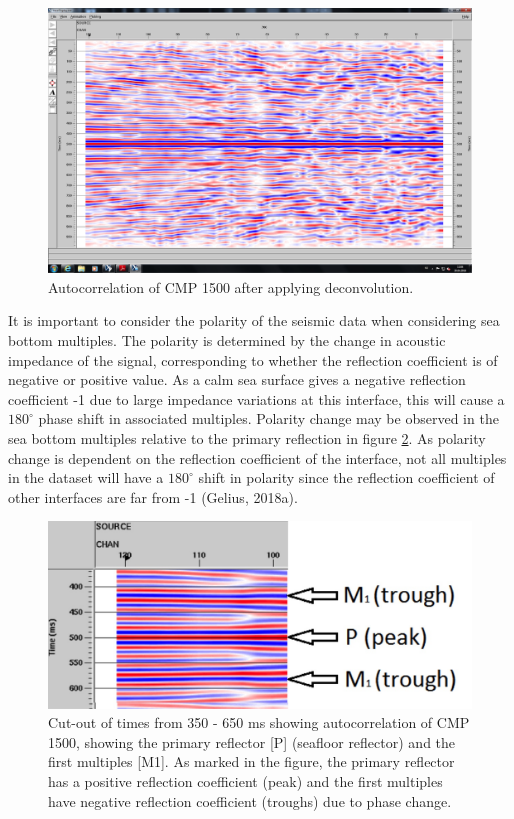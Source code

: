\documentclass[10pt,a4paper]{article}
\begin{document}
\begin{figure}[H]
\includegraphics[width=\textwidth, trim={2cm 4cm 1cm 2cm},clip]{fig16.jpg}
\caption{Autocorrelation of CMP 1500 after applying deconvolution.}
\label{fig16}
\end{figure}

\noindent It is important to consider the polarity of the seismic data when considering sea bottom multiples. The polarity is determined by the change in acoustic impedance of the signal, corresponding to whether the reflection coefficient is of negative or positive value. As a calm sea surface gives a negative reflection coefficient -1 due to large impedance variations at this interface, this will cause a $180^{\circ}$ phase shift in associated multiples. Polarity change may be observed in the sea bottom multiples relative to the primary reflection in figure \ref{fig17}. As polarity change is dependent on the reflection coefficient of the interface, not all multiples in the dataset will have a $180^{\circ}$ shift in polarity since the reflection coefficient of other interfaces are far from -1 (Gelius, 2018a).


\begin{figure}[H]
\centering
\includegraphics[width=\textwidth]{fig17.jpg}
\caption{Cut-out of times from 350 - 650 ms showing autocorrelation of CMP 1500, showing the primary reflector [P] (seafloor reflector) and the first multiples [M1]. As marked in the figure, the primary reflector has a positive reflection coefficient (peak) and the first multiples have negative reflection coefficient (troughs) due to phase change.}
\label{fig17}
\end{figure}
\end{document}
